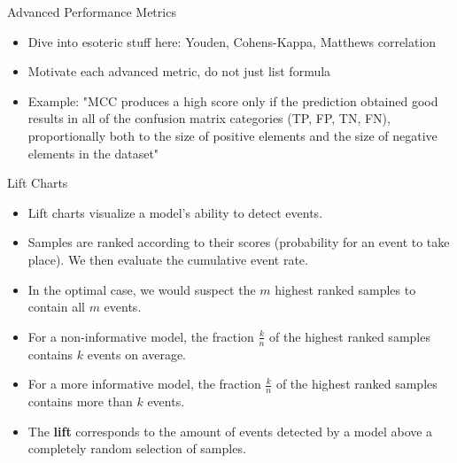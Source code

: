 \documentclass[11pt,compress,t,notes=noshow, aspectratio=169, xcolor=table]{beamer}
\begin{document}
\begin{frame}{Advanced Performance Metrics}

\begin{itemize}
\setlength\itemsep{2em}
    \item Dive into esoteric stuff here: Youden, Cohens-Kappa, Matthews correlation
    \item Motivate each advanced metric, do not just list formula
    \item Example: "MCC produces a high score only if the prediction obtained good results in all of the confusion matrix categories (TP, FP, TN, FN), proportionally both to the size of positive elements and the size of negative elements in the dataset"
\end{itemize}
\end{frame}



\begin{frame}{Lift Charts}

\begin{itemize}
\setlength\itemsep{1em}
    \item Lift charts visualize a model's ability to detect events.
    \item Samples are ranked according to their scores (probability for an event to take place). We then evaluate the cumulative event rate.
    \item In the optimal case, we would suspect the $m$ highest ranked samples to contain all $m$ events.
    \item For a non-informative model, the fraction $\frac{k}{n}$ of the highest ranked samples contains $k$ events on average.
    \item For a more informative model, the fraction $\frac{k}{n}$ of the highest ranked samples contains more than $k$ events.
    \item The \textbf{lift} corresponds to the amount of events detected by a model above a completely random selection of samples.
\end{itemize}
\end{frame}
\end{document}
